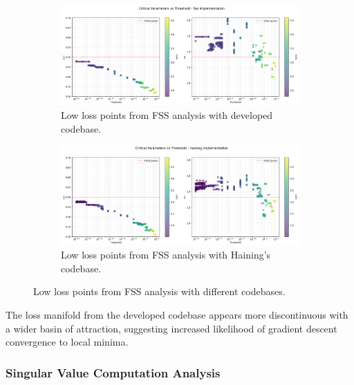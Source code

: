 \documentclass[11pt,a4paper]{article}
\begin{document}
\begin{figure}[H]
    \centering
    \begin{subfigure}[t]{0.8\linewidth}
        \centering
        \includegraphics[width=\linewidth]{threshold_dependence_pctrl0.000_tao.png}
        \caption{Low loss points from FSS analysis with developed codebase.}
        \label{fig:loss_manifold_developed}
    \end{subfigure}
    \vfill
    \begin{subfigure}[b]{0.8\linewidth}
        \centering
        \includegraphics[width=\linewidth]{threshold_dependence_pctrl0.000_haining.png}
        \caption{Low loss points from FSS analysis with Haining's codebase.}
        \label{fig:loss_manifold_haining}
    \end{subfigure}
    \caption{Low loss points from FSS analysis with different codebases.}
    \label{fig:loss_manifolds_combined}
\end{figure}

The loss manifold from the developed codebase appears more discontinuous with a wider basin of attraction, suggesting increased likelihood of gradient descent convergence to local minima.

\subsubsection{Singular Value Computation Analysis}
\end{document}
